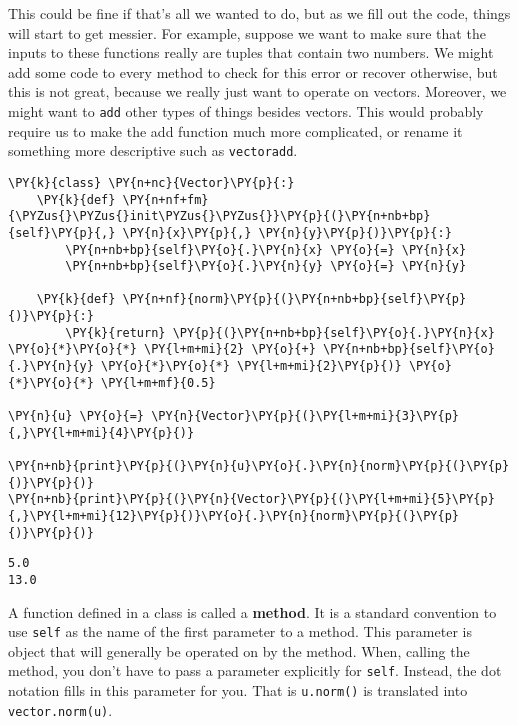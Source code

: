 This could be fine if that's all we wanted to do, but as we fill out the code, things will start to get messier.  For example, suppose we want to make sure that the inputs to these functions really are tuples that contain two numbers.  We might add some code to every method to check for this error or recover otherwise, but this is not great, because we really just want to operate on vectors.  Moreover, we might want to \texttt{add} other types of things besides vectors.  This would probably require us to make the add function much more complicated, or rename it something more descriptive such as \texttt{vectoradd}.


\begin{Verbatim}[commandchars=\\\{\}]
\PY{k}{class} \PY{n+nc}{Vector}\PY{p}{:}
    \PY{k}{def} \PY{n+nf+fm}{\PYZus{}\PYZus{}init\PYZus{}\PYZus{}}\PY{p}{(}\PY{n+nb+bp}{self}\PY{p}{,} \PY{n}{x}\PY{p}{,} \PY{n}{y}\PY{p}{)}\PY{p}{:}
        \PY{n+nb+bp}{self}\PY{o}{.}\PY{n}{x} \PY{o}{=} \PY{n}{x}
        \PY{n+nb+bp}{self}\PY{o}{.}\PY{n}{y} \PY{o}{=} \PY{n}{y}

    \PY{k}{def} \PY{n+nf}{norm}\PY{p}{(}\PY{n+nb+bp}{self}\PY{p}{)}\PY{p}{:}
        \PY{k}{return} \PY{p}{(}\PY{n+nb+bp}{self}\PY{o}{.}\PY{n}{x} \PY{o}{*}\PY{o}{*} \PY{l+m+mi}{2} \PY{o}{+} \PY{n+nb+bp}{self}\PY{o}{.}\PY{n}{y} \PY{o}{*}\PY{o}{*} \PY{l+m+mi}{2}\PY{p}{)} \PY{o}{*}\PY{o}{*} \PY{l+m+mf}{0.5}

\PY{n}{u} \PY{o}{=} \PY{n}{Vector}\PY{p}{(}\PY{l+m+mi}{3}\PY{p}{,}\PY{l+m+mi}{4}\PY{p}{)}

\PY{n+nb}{print}\PY{p}{(}\PY{n}{u}\PY{o}{.}\PY{n}{norm}\PY{p}{(}\PY{p}{)}\PY{p}{)}
\PY{n+nb}{print}\PY{p}{(}\PY{n}{Vector}\PY{p}{(}\PY{l+m+mi}{5}\PY{p}{,}\PY{l+m+mi}{12}\PY{p}{)}\PY{o}{.}\PY{n}{norm}\PY{p}{(}\PY{p}{)}\PY{p}{)}
\end{Verbatim}

\begin{Verbatim}
5.0
13.0
\end{Verbatim}


A function defined in a class is called a \textbf{method}.  It is a standard convention to use \texttt{self} as the name of the first parameter to a method.  This parameter is object that will generally be operated on by the method.  When, calling the method, you don't have to pass a parameter explicitly for \texttt{self}.  Instead, the dot notation fills in this parameter for you.  That is \texttt{u.norm()} is translated into \texttt{vector.norm(u)}.  


